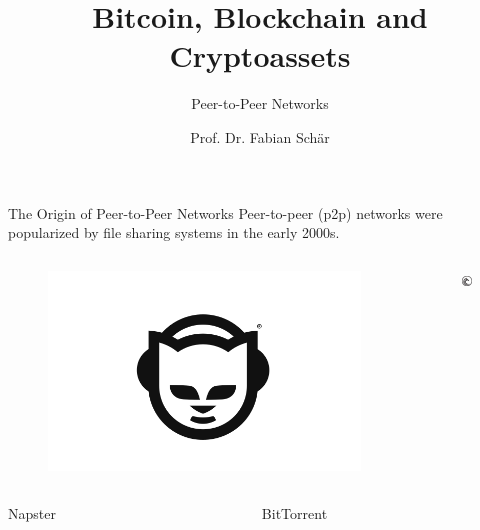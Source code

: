 \documentclass[handout]{beamer}
\title{Bitcoin, Blockchain and Cryptoassets}
\subtitle{Peer-to-Peer Networks}
\author{Prof. Dr. Fabian Schär}
\institute{University of Basel}
\begin{document}
\thispagestyle{empty}
\begin{frame}[noframenumbering]
	\titlepage
\end{frame}

\begin{frame}{The Origin of Peer-to-Peer Networks}
	Peer-to-peer (p2p) networks were popularized by file sharing systems in the early 2000s.
	\begin{columns}
		\begin{column}{0.5\textwidth}
			\begin{figure}
				\begin{center}
					\includegraphics[height = 0.25\textheight]{../assets/images/napster}
				\end{center}
			\end{figure}
		\end{column}
		\begin{column}{0.5\textwidth}
			\begin{figure}
				\begin{center}
					\includegraphics[height = 0.17\textheight]{../assets/images/btt}
				\end{center}
			\end{figure}
		\end{column}
	\end{columns}
	\begin{columns}
		\begin{column}{0.5\textwidth}
			\begin{center}
				Napster
			\end{center}
		\end{column}
		\begin{column}{0.5\textwidth}
			\begin{center}
				BitTorrent
			\end{center}
		\end{column}
	\end{columns}
	\vspace{1.8em}
\end{frame}
\end{document}
